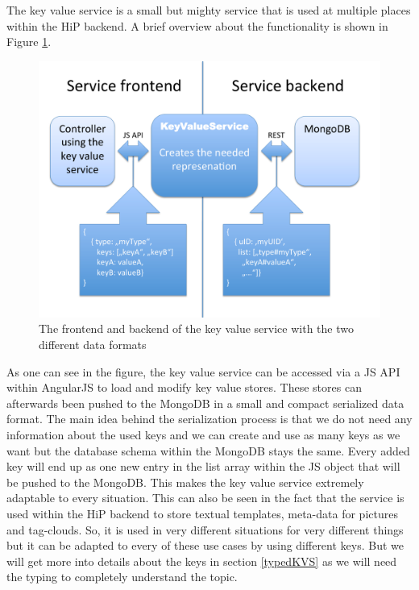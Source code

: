 The key value service is a small but mighty service that is used at multiple places within the \ac{HiP} backend. A brief overview about the functionality is shown in Figure \ref{KVS}.

\begin{figure}[th]
\centerline{\includegraphics[width=1\textwidth]{gfx/kvs}}
\caption{The frontend and backend of the key value service with the two different data formats}
\label{KVS}
\end{figure}

As one can see in the figure, the key value service can be accessed via a \ac{JS} \ac{API} within AngularJS to load and modify key value stores. These stores can afterwards been pushed to the MongoDB in a small and compact serialized data format. The main idea behind the serialization process is that we do not need any information about the used keys and we can create and use as many keys as we want but the database schema within the MongoDB stays the same. Every added key will end up as one new entry in the list array within the \ac{JS} object that will be pushed to the MongoDB. This makes the key value service extremely adaptable to every situation. This can also be seen in the fact that the service is used within the \ac{HiP} backend to store textual templates, meta-data for pictures and tag-clouds. So, it is used in very different situations for very different things but it can be adapted to every of these use cases by using different keys. But we will get more into details about the keys in section \ref{typedKVS} as we will need the typing to completely understand the topic.
 
